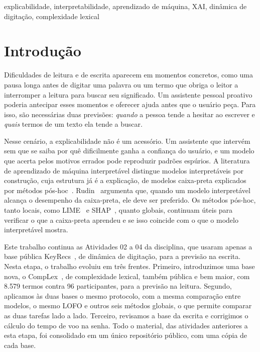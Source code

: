 \documentclass[conference]{IEEEtran}
\begin{document}
\begin{IEEEkeywords}
explicabilidade, interpretabilidade, aprendizado de máquina, XAI, dinâmica de
digitação, complexidade lexical
\end{IEEEkeywords}

\section{Introdução}

Dificuldades de leitura e de escrita aparecem em momentos concretos, como uma
pausa longa antes de digitar uma palavra ou um termo que obriga o leitor a
interromper a leitura para buscar seu significado. Um assistente pessoal
proativo poderia antecipar esses momentos e oferecer ajuda antes que o usuário
peça. Para isso, são necessárias duas previsões: \emph{quando} a pessoa tende a
hesitar ao escrever e \emph{quais} termos de um texto ela tende a buscar.

Nesse cenário, a explicabilidade não é um acessório. Um assistente que intervém
sem que se saiba por quê dificilmente ganha a confiança do usuário, e um modelo
que acerta pelos motivos errados pode reproduzir padrões espúrios. A literatura
de aprendizado de máquina interpretável distingue modelos interpretáveis por
construção, cuja estrutura já é a explicação, de modelos caixa-preta explicados
por métodos pós-hoc~\cite{molnar2022,doshivelez2017}. Rudin~\cite{rudin2019stop}
argumenta que, quando um modelo interpretável alcança o desempenho da
caixa-preta, ele deve ser preferido. Os métodos pós-hoc, tanto locais, como
LIME~\cite{ribeiro2016lime} e SHAP~\cite{lundberg2017shap}, quanto globais,
continuam úteis para verificar o que a caixa-preta aprendeu e se isso coincide
com o que o modelo interpretável mostra.

Este trabalho continua as Atividades 02 a 04 da disciplina, que usaram apenas
a base pública KeyRecs~\cite{dias2023keyrecs,dias2023keyrecsdata}, de dinâmica
de digitação, para a previsão na escrita. Nesta etapa, o trabalho evoluiu em
três frentes. Primeiro, introduzimos uma base nova, o
CompLex~\cite{shardlow2020complex}, de complexidade lexical, também pública e
bem maior, com 8.579 termos contra 96 participantes, para a previsão na
leitura. Segundo, aplicamos às duas bases o mesmo protocolo, com a mesma
comparação entre modelos, o mesmo LOFO e outros seis métodos globais, o que
permite comparar as duas tarefas lado a lado. Terceiro, revisamos a base da
escrita e corrigimos o cálculo do tempo de voo na senha. Todo o material, das
atividades anteriores a esta etapa, foi consolidado em um único repositório
público, com uma cópia de cada base.
\end{document}

